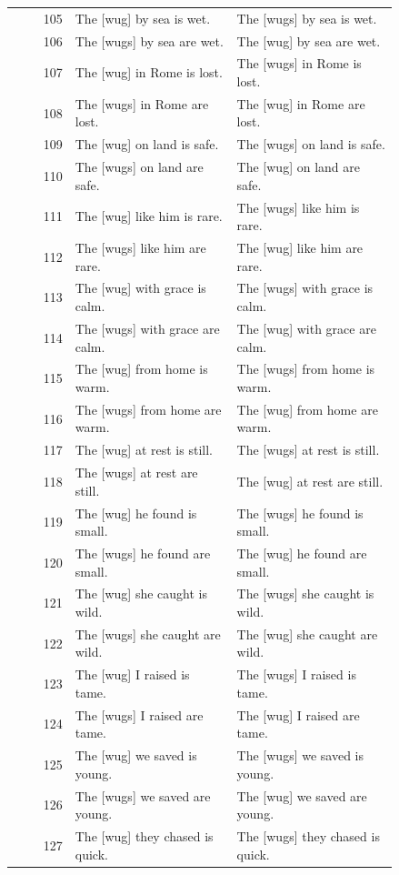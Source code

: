 \begin{longtable}{@{}rp{0.42\linewidth}p{0.42\linewidth}@{}}
105 & The {[}wug{]} by sea is wet. & The {[}wugs{]} by sea is wet. \\
106 & The {[}wugs{]} by sea are wet. & The {[}wug{]} by sea are wet. \\
107 & The {[}wug{]} in Rome is lost. & The {[}wugs{]} in Rome is lost. \\
108 & The {[}wugs{]} in Rome are lost. & The {[}wug{]} in Rome are lost. \\
109 & The {[}wug{]} on land is safe. & The {[}wugs{]} on land is safe. \\
110 & The {[}wugs{]} on land are safe. & The {[}wug{]} on land are safe. \\
111 & The {[}wug{]} like him is rare. & The {[}wugs{]} like him is rare. \\
112 & The {[}wugs{]} like him are rare. & The {[}wug{]} like him are rare. \\
113 & The {[}wug{]} with grace is calm. & The {[}wugs{]} with grace is calm. \\
114 & The {[}wugs{]} with grace are calm. & The {[}wug{]} with grace are calm. \\
115 & The {[}wug{]} from home is warm. & The {[}wugs{]} from home is warm. \\
116 & The {[}wugs{]} from home are warm. & The {[}wug{]} from home are warm. \\
117 & The {[}wug{]} at rest is still. & The {[}wugs{]} at rest is still. \\
118 & The {[}wugs{]} at rest are still. & The {[}wug{]} at rest are still. \\
119 & The {[}wug{]} he found is small. & The {[}wugs{]} he found is small. \\
120 & The {[}wugs{]} he found are small. & The {[}wug{]} he found are small. \\
121 & The {[}wug{]} she caught is wild. & The {[}wugs{]} she caught is wild. \\
122 & The {[}wugs{]} she caught are wild. & The {[}wug{]} she caught are wild. \\
123 & The {[}wug{]} I raised is tame. & The {[}wugs{]} I raised is tame. \\
124 & The {[}wugs{]} I raised are tame. & The {[}wug{]} I raised are tame. \\
125 & The {[}wug{]} we saved is young. & The {[}wugs{]} we saved is young. \\
126 & The {[}wugs{]} we saved are young. & The {[}wug{]} we saved are young. \\
127 & The {[}wug{]} they chased is quick. & The {[}wugs{]} they chased is quick. \\

\end{longtable}
